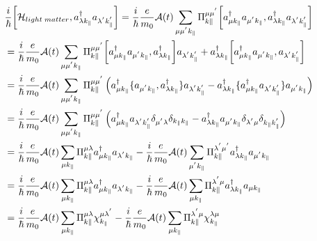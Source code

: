 \begin{align}
&\frac{i}{\hbar}\biggl[\mathcal{H}_{light \;matter},a_{\lambda k_{\parallel}}^{\dagger}a_{\lambda^{'} k_{\parallel}^{'}}\biggr]=\frac{i}{\hbar}\frac{e}{m_0}\mathcal{A}(t)\sum_{\mu\mu^{'}k_{\parallel}}\Pi_{k{\parallel}}^{\mu\mu^{'}}
\biggl[
a_{\mu k_{\parallel}}^{\dagger}a_{\mu^{'} k_{\parallel}},a_{\lambda k_{\parallel}}^{\dagger}a_{\lambda^{'} k_{\parallel}^{'}}\biggr]\notag\\
&=\frac{i}{\hbar}\frac{e}{m_0}\mathcal{A}(t)\sum_{\mu\mu^{'}k_{\parallel}}\Pi_{k{\parallel}}^{\mu\mu^{'}}
\biggl[a_{\mu k_{\parallel}}^{\dagger}a_{\mu^{'} k_{\parallel}},a_{\lambda k_{\parallel}}^{\dagger}\biggr]a_{\lambda^{'} k_{\parallel}^{'}} + 
a_{\lambda k_{\parallel}}^{\dagger}\biggl[a_{\mu k_{\parallel}}^{\dagger}a_{\mu^{'} k_{\parallel}},a_{\lambda^{'} k_{\parallel}^{'}}\biggr]\notag\\
&=\frac{i}{\hbar}\frac{e}{m_0}\mathcal{A}(t)\sum_{\mu\mu^{'}k_{\parallel}}\Pi_{k{\parallel}}^{\mu\mu^{'}}
\left(
a_{\mu k_{\parallel}}^{\dagger}\{a_{\mu^{'} k_{\parallel}},a_{\lambda k_{\parallel}}^{\dagger}\}a_{\lambda^{'}k_{\parallel}^{'}}-
a_{\lambda k_{\parallel}}^{\dagger}\{a_{\mu k_{\parallel}}^{\dagger}a_{\lambda^{'}k_{\parallel}^{'}}\}a_{\mu^{'} k_{\parallel}}
\right)\notag\\
&=\frac{i}{\hbar}\frac{e}{m_0}\mathcal{A}(t)\sum_{\mu\mu^{'}k_{\parallel}}\Pi_{k{\parallel}}^{\mu\mu^{'}}
\left(
a_{\mu k_{\parallel}}^{\dagger}a_{\lambda^{'}k_{\parallel}^{'}}\delta_{\mu^{'}\lambda}
\delta_{k_{\parallel}k_{\parallel}} -
a_{\lambda k_{\parallel}}^{\dagger}a_{\mu^{'} k_{\parallel}}\delta_{\lambda^{'}\mu}\delta_{k_{\parallel}k_{\parallel}^{'}}
\right)\notag\\
&=\frac{i}{\hbar}\frac{e}{m_0}\mathcal{A}(t)\sum_{\mu k_{\parallel}}\Pi_{k{\parallel}}^{\mu\lambda}a_{\mu k_{\parallel}}^{\dagger}a_{\lambda^{'}k_{\parallel}}
-\frac{i}{\hbar}\frac{e}{m_0}\mathcal{A}(t)\sum_{\mu^{'}k_{\parallel}}\Pi_{k{\parallel}}^{\lambda^{'}\mu^{'}}
a_{\lambda k_{\parallel}}^{\dagger}a_{\mu^{'} k_{\parallel}}\notag\\
&=\frac{i}{\hbar}\frac{e}{m_0}\mathcal{A}(t)\sum_{\mu k_{\parallel}}\Pi_{k{\parallel}}^{\mu\lambda}a_{\mu k_{\parallel}}^{\dagger}a_{\lambda^{'}k_{\parallel}}
-\frac{i}{\hbar}\frac{e}{m_0}\mathcal{A}(t)\sum_{\mu k_{\parallel}}\Pi_{k{\parallel}}^{\lambda^{'}\mu}
a_{\lambda k_{\parallel}}^{\dagger}a_{\mu k_{\parallel}}\notag\\
&=\frac{i}{\hbar}\frac{e}{m_0}\mathcal{A}(t)\sum_{\mu k_{\parallel}}\Pi_{k{\parallel}}^{\mu\lambda}\chi_{k_\parallel}^{\mu\lambda^{'}}
-\frac{i}{\hbar}\frac{e}{m_0}\mathcal{A}(t)\sum_{\mu k_{\parallel}}\Pi_{k{\parallel}}^{\lambda^{'}\mu}
\chi_{k_{\parallel}}^{\lambda\mu}
\end{align}
